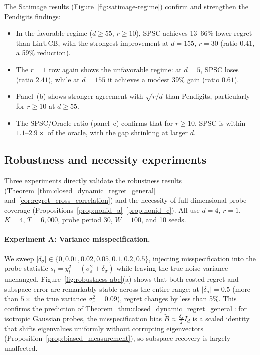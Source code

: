 \documentclass{article}
\begin{document}
{  The Satimage results (Figure~\ref{fig:satimage-regime}) confirm and
  strengthen the Pendigits findings:
  \begin{itemize}[nosep,leftmargin=1.5em]
    \item In the favorable regime ($d \ge 55$, $r \ge 10$), SPSC achieves
      13--66\% lower regret than LinUCB, with the strongest improvement at
      $d{=}155$, $r{=}30$ (ratio $0.41$, a 59\% reduction).
    \item The $r{=}1$ row again shows the unfavorable regime:
      at $d{=}5$, SPSC loses (ratio $2.41$), while at $d{=}155$ it
      achieves a modest 39\% gain (ratio $0.61$).
    \item Panel~(b) shows stronger agreement with $\sqrt{r/d}$ than
      Pendigits, particularly for $r \ge 10$ at $d \ge 55$.
    \item The SPSC/Oracle ratio (panel~c) confirms that for $r \ge 10$,
      SPSC is within $1.1$--$2.9\times$ of the oracle, with the gap
      shrinking at larger $d$.
  \end{itemize}
 \subsection{Robustness and necessity experiments}
  \label{app:robustness_necessity}

  Three experiments directly validate the robustness results
  (Theorem~\ref{thm:closed_dynamic_regret_general}
  and~\ref{cor:regret_cross_correlation}) and the necessity of full-dimensional
  probe coverage (Propositions~\ref{prop:nonid_a}--\ref{prop:nonid_c}).
  All use $d{=}4$, $r{=}1$, $K{=}4$, $T{=}6{,}000$, probe period 30,
  $W{=}100$, and 10 seeds.

  \paragraph{Experiment A: Variance misspecification.}
  We sweep $|\delta_\sigma| \in \{0, 0.01, 0.02, 0.05, 0.1, 0.2, 0.5\}$,
  injecting misspecification into the probe statistic
  $s_t = y_t^2 - (\sigma_\varepsilon^2 + \delta_\sigma)$ while leaving the
  true noise variance unchanged.
  Figure~\ref{fig:robustness-abc}(a) shows that both costed regret and
  subspace error are remarkably stable across the entire range: at
  $|\delta_\sigma| = 0.5$ (more than $5\times$ the true variance
  $\sigma_\varepsilon^2 = 0.09$), regret changes by less than 5\%.
  This confirms the prediction of Theorem~\ref{thm:closed_dynamic_regret_general}:
  for isotropic Gaussian probes, the misspecification bias
  $\widetilde B \approx \frac{\delta_\sigma}{2}I_d$ is a scaled identity that
  shifts eigenvalues uniformly without corrupting eigenvectors
  (Proposition~\ref{prop:biased_measurement}), so subspace recovery is
  largely unaffected.

}
\end{document}
